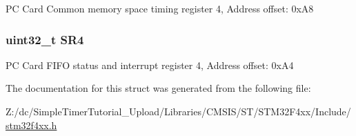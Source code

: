 P\-C Card Common memory space timing register 4, Address offset\-: 0x\-A8 \hypertarget{struct_f_s_m_c___bank4___type_def_a8218d6e11dae5d4468c69303dec0b4fc}{
\subsubsection[{S\-R4}]{ uint32\-\_\-t S\-R4}}\label{struct_f_s_m_c___bank4___type_def_a8218d6e11dae5d4468c69303dec0b4fc}
P\-C Card F\-I\-F\-O status and interrupt register 4, Address offset\-: 0x\-A4 

The documentation for this struct was generated from the following file\-:\begin{DoxyCompactItemize}
\item 
Z\-:/dc/\-Simple\-Timer\-Tutorial\-\_\-\-Upload/\-Libraries/\-C\-M\-S\-I\-S/\-S\-T/\-S\-T\-M32\-F4xx/\-Include/\hyperlink{stm32f4xx_8h}{stm32f4xx.\-h}\end{DoxyCompactItemize}
